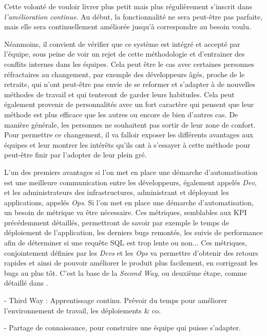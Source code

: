 Cette volonté de vouloir livrer plus petit mais plus régulièrement s'inscrit dans \emph{l'amélioration continue}. Au début, la fonctionnalité ne sera peut-être pas parfaite, mais elle sera continuellement améliorée jusqu'à correspondre au besoin voulu.

Néanmoins, il convient de vérifier que ce système est intégré et accepté par l'équipe, sous peine de voir un rejet de cette méthodologie et d'entrainer des conflits internes dans les équipes. Cela peut être le cas avec certaines personnes réfractaires au changement, par exemple des développeurs âgés, proche de le retraite, qui n'ont peut-être pas envie de se reformer et s'adapter à de nouvelles méthodes de travail et qui tenteront de garder leurs habitudes. Cela peut également provenir de personnalités avec un fort caractère qui pensent que leur méthode est plus efficace que les autres ou encore de bien d'autres cas. De manière générale, les personnes ne souhaitent pas sortir de leur zone de confort. Pour permettre ce changement, il va falloir exposer les différents avantages aux équipes et leur montrer les intérêts qu'ils ont à s'essayer à cette méthode pour peut-être finir par l'adopter de leur plein gré.

L'un des premiers avantages si l'on met en place une démarche d'automatisation est une meilleure communication entre les développeurs, également appelés \emph{Dev}, et les administrateurs des infrastructures, administrant et déployant les applications, appelés \emph{Ops}. Si l'on met en place une démarche d'automatisation, un besoin de métrique va être nécessaire. Ces métriques, semblables aux \gls{KPI} précédemment détaillés, permettront de savoir par exemple le temps de déploiement de l'application, les derniers bugs remontés, les suivis de performance afin de déterminer si une requête \gls{SQL} est trop lente ou non... Ces métriques, conjointement définies par les \emph{Devs} et les \emph{Ops} va permettre d'obtenir des retours rapides et ainsi de pouvoir améliorer le produit plus facilement, en corrigeant les bugs au plus tôt. C'est la base de la \emph{Second Way}, ou deuxième étape, comme détaillé dans  \cite{phoenixProject} .


- Third Way : Apprentissage continu. Prévoir du temps pour améliorer l'environnement de travail, les déploiements  \& co.

- Partage de connaissance, pour construire une équipe qui puisse s'adapter.

